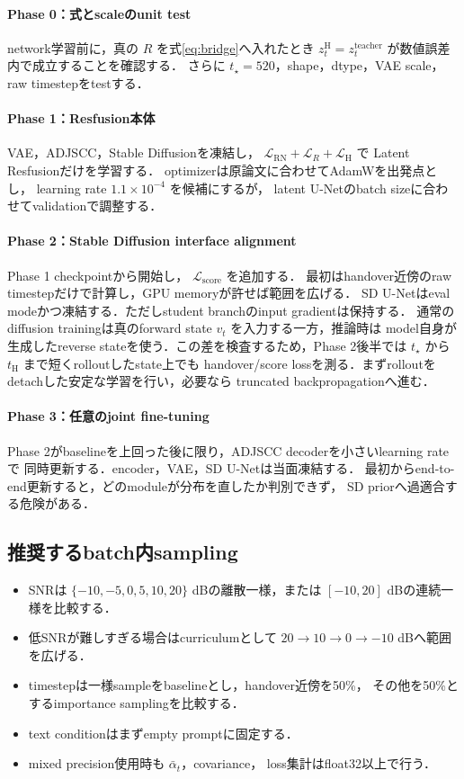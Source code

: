 \documentclass[11pt,a4paper]{ltjsarticle}
\begin{document}
\paragraph{Phase 0：式とscaleのunit test}
network学習前に，真の \(R\) を式\eqref{eq:bridge}へ入れたとき
\(z_t^{\mathrm H}=z_t^{\mathrm{teacher}}\) が数値誤差内で成立することを確認する．
さらに \(t_\star=520\)，shape，dtype，VAE scale，raw timestepをtestする．

\paragraph{Phase 1：Resfusion本体}
VAE，ADJSCC，Stable Diffusionを凍結し，
\(\mathcal L_{\mathrm{RN}}+\mathcal L_R+\mathcal L_{\mathrm H}\) で
Latent Resfusionだけを学習する．
optimizerは原論文に合わせてAdamWを出発点とし，
learning rate \(1.1\times10^{-4}\) を候補にするが，
latent U-Netのbatch sizeに合わせてvalidationで調整する．

\paragraph{Phase 2：Stable Diffusion interface alignment}
Phase 1 checkpointから開始し，
\(\mathcal L_{\mathrm{score}}\) を追加する．
最初はhandover近傍のraw timestepだけで計算し，GPU memoryが許せば範囲を広げる．
SD U-Netはeval modeかつ凍結する．ただしstudent branchのinput gradientは保持する．
通常のdiffusion trainingは真のforward state \(v_t\) を入力する一方，推論時は
model自身が生成したreverse stateを使う．この差を検査するため，Phase 2後半では
\(t_\star\) から \(t_{\mathrm H}\) まで短くrolloutしたstate上でも
handover/score lossを測る．まずrolloutをdetachした安定な学習を行い，必要なら
truncated backpropagationへ進む．

\paragraph{Phase 3：任意のjoint fine-tuning}
Phase 2がbaselineを上回った後に限り，ADJSCC decoderを小さいlearning rateで
同時更新する．encoder，VAE，SD U-Netは当面凍結する．
最初からend-to-end更新すると，どのmoduleが分布を直したか判別できず，
SD priorへ過適合する危険がある．

\subsection{推奨するbatch内sampling}

\begin{itemize}
  \item SNRは \(\{-10,-5,0,5,10,20\}\) dBの離散一様，または
        \([-10,20]\) dBの連続一様を比較する．
  \item 低SNRが難しすぎる場合はcurriculumとして
        \(20\to10\to0\to-10\) dBへ範囲を広げる．
  \item timestepは一様sampleをbaselineとし，handover近傍を50\%，
        その他を50\%とするimportance samplingを比較する．
  \item text conditionはまずempty promptに固定する．
  \item mixed precision使用時も \(\bar\alpha_t\)，covariance，
        loss集計はfloat32以上で行う．
\end{itemize}
\end{document}

